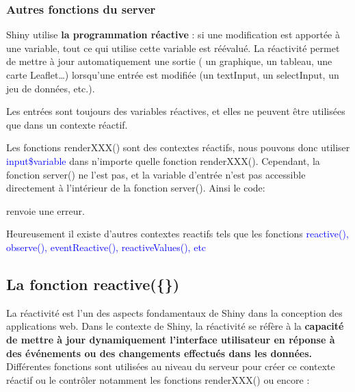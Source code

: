 \documentclass[
]{article}
\newenvironment{Shaded}{\begin{snugshade}}{\end{snugshade}}
\newcommand{\ControlFlowTok}[1]{\textcolor[rgb]{0.13,0.29,0.53}{\textbf{#1}}}
\newcommand{\FunctionTok}[1]{\textcolor[rgb]{0.00,0.00,0.00}{#1}}
\newcommand{\NormalTok}[1]{#1}
\newcommand{\OtherTok}[1]{\textcolor[rgb]{0.56,0.35,0.01}{#1}}
\newcommand{\SpecialCharTok}[1]{\textcolor[rgb]{0.00,0.00,0.00}{#1}}
\begin{document}
\hypertarget{autres-fonctions-du-server}{%
\subsubsection{Autres fonctions du
server}\label{autres-fonctions-du-server}}

Shiny utilise \textbf{la programmation réactive} : si une modification
est apportée à une variable, tout ce qui utilise cette variable est
réévalué. La réactivité permet de mettre à jour automatiquement une
sortie ( un graphique, un tableau, une carte Leaflet\ldots) lorsqu'une
entrée est modifiée (un textInput, un selectInput, un jeu de données,
etc.).

Les entrées sont toujours des variables réactives, et elles ne peuvent
être utilisées que dans un contexte réactif.

Les fonctions renderXXX() sont des contextes réactifs, nous pouvons donc
utiliser \textcolor{blue}{input\$variable} dans n'importe quelle
fonction renderXXX(). Cependant, la fonction server() ne l'est pas, et
la variable d'entrée n'est pas accessible directement à l'intérieur de
la fonction server(). Ainsi le code:

\begin{Shaded}
\end{Shaded}

renvoie une erreur.

Heureusement il existe d'autres contextes reactifs tels que les
fonctions
\textcolor{blue}{reactive(), observe(), eventReactive(), reactiveValues(), etc}

\hypertarget{la-fonction-reactive}{%
\subsection{La fonction reactive(\{\})}\label{la-fonction-reactive}}

La réactivité est l'un des aspects fondamentaux de Shiny dans la
conception des applications web. Dans le contexte de Shiny, la
réactivité se réfère à la \textbf{capacité de mettre à jour
dynamiquement l'interface utilisateur en réponse à des événements ou des
changements effectués dans les données.} Différentes fonctions sont
utilisées au niveau du serveur pour créer ce contexte réactif ou le
contrôler notamment les fonctions renderXXX() ou encore :
\end{document}
